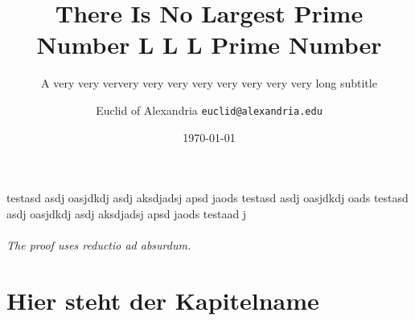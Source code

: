 \documentclass[aspectratio=169]{beamer}
\title{There Is No Largest Prime Number L L L Prime Number}
\subtitle{A very very ververy very very very very very very very long subtitle}
\date{\today}
\author[Euclid]{Euclid of Alexandria \texttt{euclid@alexandria.edu}}
\begin{document}
	

\begin{frame}
\titlepage
\end{frame}


\begin{frame}{testasd asdj oasjdkdj asdj aksdjadsj apsd jaods testasd asdj oasjdkdj oads testasd asdj oasjdkdj asdj aksdjadsj apsd jaods testaad j}
	
	\framesubtitle{The proof uses \textit{reductio ad absurdum}.} 
	\blindtext[2]
\end{frame}

\part{Hier steht der Kapitelname}
\end{document}
